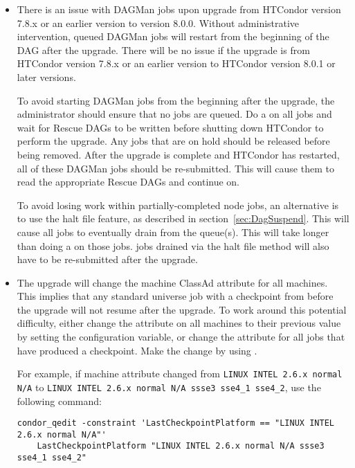 \begin{itemize}

\item There is an issue with DAGMan jobs upon upgrade
from HTCondor version 7.8.x or an earlier version
to version 8.0.0.
Without administrative intervention,
queued DAGMan jobs will restart from the beginning of the DAG
after the upgrade.
There will be no issue if the upgrade is 
from HTCondor version 7.8.x or an earlier version to HTCondor version 8.0.1
or later versions.

To avoid starting DAGMan jobs from the beginning after the upgrade,
the administrator should ensure that no  jobs are queued.
Do a  on all  jobs and wait for Rescue DAGs
to be written before shutting down HTCondor to perform the upgrade.
Any  jobs that are on hold should be released before
being removed.
After the upgrade is complete and HTCondor has restarted,
all of these DAGMan jobs should be re-submitted.
This will cause them to read the appropriate Rescue DAGs and 
continue on.

To avoid losing work within partially-completed node jobs,
an alternative is to use the halt file feature,
as described in section~\ref{sec:DagSuspend}.
This will cause all
 jobs to eventually drain from the queue(s).
This will take longer than doing a  on those jobs.
 jobs drained via the halt file method will also
have to be re-submitted after the upgrade.

\item The upgrade will change the machine ClassAd attribute
 for all machines.
This implies that any standard universe job with a checkpoint 
from before the upgrade will not resume after the upgrade.
To work around this potential difficulty, either change the 
attribute  on all machines to their previous value 
by setting the  configuration variable,
or change the  attribute for all jobs
that have produced a checkpoint.
Make the change by using .

For example, if machine attribute  changed 
from \verb;LINUX INTEL 2.6.x normal N/A; to 
\verb;LINUX INTEL 2.6.x normal N/A ssse3 sse4_1 sse4_2;,
use the following command:

\footnotesize
\begin{verbatim}
condor_qedit -constraint 'LastCheckpointPlatform == "LINUX INTEL 2.6.x normal N/A"'
    LastCheckpointPlatform "LINUX INTEL 2.6.x normal N/A ssse3 sse4_1 sse4_2"
\end{verbatim}
\normalsize

\end{itemize}

